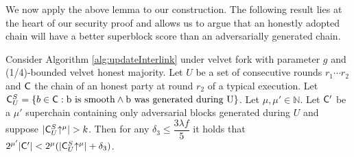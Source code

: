 We now apply the above lemma to our construction. The following result lies at
the heart of our security proof and allows us to argue that an honestly adopted
chain will have a better superblock score than an adversarially generated chain.

\begin{lemma}\label{lem:claim3_lemma}
   Consider Algorithm \ref{alg:updateInterlink} under velvet fork with parameter $g$ and (1/4)-bounded velvet honest majority. Let $U$ be a set of consecutive rounds $r_1 \cdots r_2$ and $\mathsf{C}$ the chain of an honest party at round $r_2$ of a typical execution. Let $\mathsf{C}^S_U = \{b \in \mathsf{C}: \text{b is smooth} \land \text{b was generated during U} \}$. Let $\mu, \mu' \in \mathbb{N}$.
   Let $\mathsf{C}'$ be a $\mu'$ superchain containing only adversarial blocks generated during $U$ and suppose $\lvert \mathsf{C}^S_U\negthickspace\uparrow^{\mu} \rvert > k$. Then for any $\delta_3 \leq \dfrac{3\lambda f}{5} $ it holds that
   $2^{\mu'}\lvert \mathsf{C}' \rvert < 2^{\mu} ( \lvert \mathsf{C}^S_U\negthickspace\uparrow^{\mu} \rvert + \delta_3 )$.
\end{lemma}
